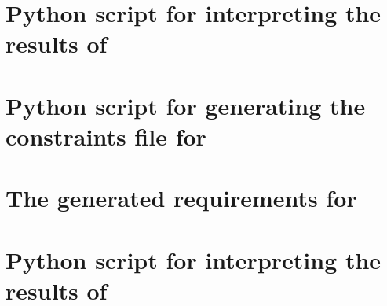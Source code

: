 \begin{appendices}
\chapter{Python script for interpreting the results of }
\label{app:3_draw.py}


\chapter{Python script for generating the constraints file for }
\label{app:4_gen.py}


\chapter{The generated requirements for }
\label{app:4_req.smt}


\chapter{Python script for interpreting the results of }
\label{app:4_table.py}






\end{appendices}